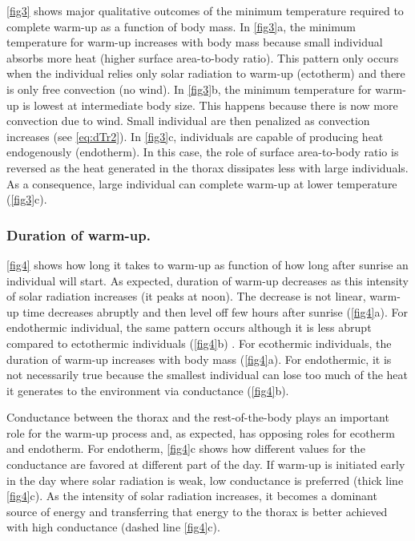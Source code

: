 \cref{fig3} shows major qualitative outcomes of the minimum temperature required to complete warm-up as a function of body mass.
In \cref{fig3}a, the minimum temperature for warm-up increases with body mass because small individual absorbs more heat (higher surface area-to-body ratio).
This pattern only occurs when the individual relies only solar radiation to warm-up (ectotherm) and there is only free convection (no wind).
In \cref{fig3}b, the minimum temperature for warm-up is lowest at intermediate body size.
This happens because there is now more convection due to wind. 
Small individual are then penalized as convection increases (see \cref{eq:dTr2}).
In \cref{fig3}c, individuals are capable of producing heat endogenously (endotherm).
In this case, the role of surface area-to-body ratio is reversed as the heat generated in the thorax dissipates less with large individuals.
As a consequence, large individual can complete warm-up at lower temperature (\cref{fig3}c).

\subsubsection*{Duration of warm-up.}
\cref{fig4} shows how long it takes to warm-up as function of how long after sunrise an individual will start.
As expected, duration of warm-up decreases as this intensity of solar radiation increases (it peaks at noon).
The decrease is not linear, warm-up time decreases abruptly and then level off few hours after sunrise (\cref{fig4}a).
For endothermic individual, the same pattern occurs although it is less abrupt compared to ectothermic individuals (\cref{fig4}b) .
For ecothermic individuals, the duration of warm-up increases with body mass (\cref{fig4}a).
For endothermic, it is not necessarily true because the smallest individual can lose too much of the heat it generates to the environment via conductance (\cref{fig4}b).

Conductance between the thorax and the rest-of-the-body plays an important role for the warm-up process and, as expected, has opposing roles for ecotherm and endotherm.
For endotherm, \cref{fig4}c shows how different values for the conductance are favored at different part of the day.
If warm-up is initiated early in the day where solar radiation is weak, low conductance is preferred (thick line \cref{fig4}c).
As the intensity of solar radiation increases, it becomes a dominant source of energy and transferring that energy to the thorax is better achieved with high conductance (dashed line \cref{fig4}c).

